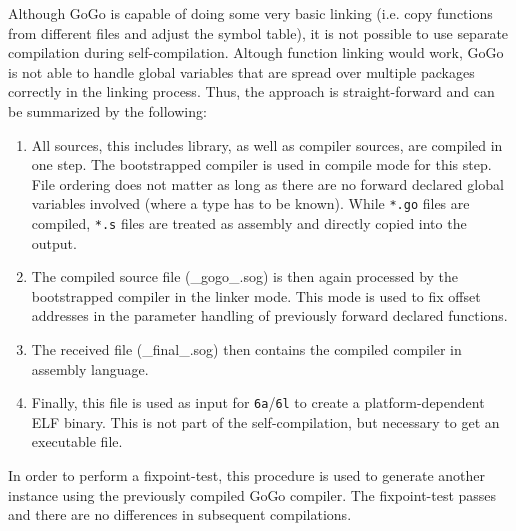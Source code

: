 \documentclass[a4paper]{scrartcl}
\begin{document}
      Although GoGo is capable of doing some very basic linking (i.e. copy 
      functions from different files and adjust the symbol table), it is not
      possible to use separate compilation during self-compilation. Altough
      function linking would work, GoGo is not able to handle global variables
      that are spread over multiple packages correctly in the linking process.
      Thus, the approach is straight-forward and can be summarized by the following:
      \begin{enumerate}
        \item All sources, this includes library, as well as compiler sources, 
          are compiled in one step. The bootstrapped compiler is used in compile
          mode for this step. 
          File ordering does not matter as long as there are no forward declared global
          variables involved (where a type has to be known). While \texttt{*.go}
          files are compiled, \texttt{*.s} files are treated as assembly and 
          directly copied into the output.
        \item The compiled source file (\_gogo\_.sog) is then again processed by
          the bootstrapped compiler in the linker mode. This mode is used to fix
          offset addresses in the parameter handling of previously forward declared functions.
        \item The received file (\_final\_.sog) then contains the compiled 
          compiler in assembly language.
        \item Finally, this file is used as input for \texttt{6a}/\texttt{6l} to
          create a platform-dependent ELF binary. This is not part of the self-compilation,
          but necessary to get an executable file.
      \end{enumerate}

      In order to perform a fixpoint-test, this procedure is used to generate 
      another instance using the previously compiled GoGo compiler. The 
      fixpoint-test passes and there are no differences in subsequent compilations.
\end{document}
